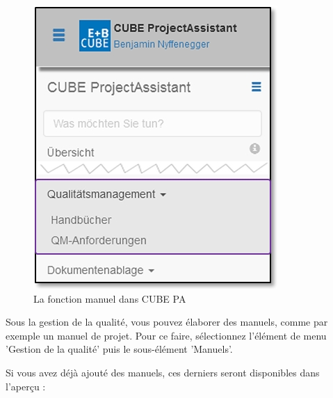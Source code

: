 \begin{figure}   %
  \vspace{-35pt}      %
  \begin{center}
    \includegraphics[width=1\linewidth]{../chapters/09_Qualitaetsmanagement/pictures/9-2_Menu_Qualitaetsmanagement_Handbuch.jpg}
  \end{center}
  \vspace{-20pt}
  \caption{La fonction manuel dans CUBE PA}
  \vspace{-10pt}
\end{figure}

Sous la gestion de la qualité, vous pouvez élaborer des manuels, comme par exemple un manuel de projet. Pour ce faire, sélectionnez l'élément de menu 'Gestion de la qualité' puis le sous-élément 'Manuels'.

\vspace{2.5cm} 

Si vous avez déjà ajouté des manuels, ces derniers seront disponibles dans l'aperçu : \\

